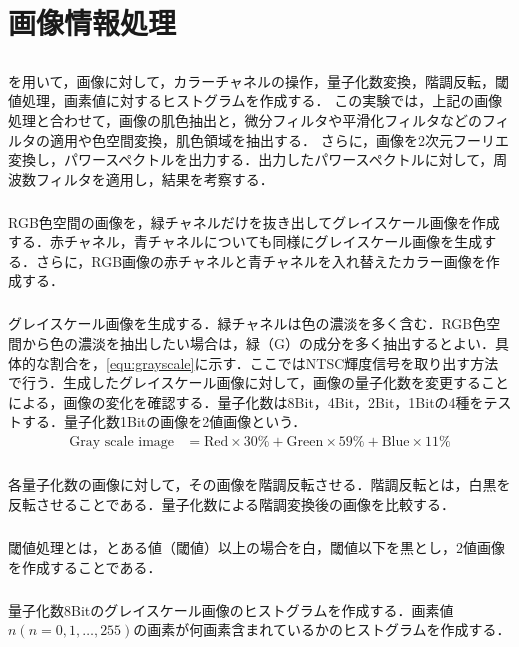 \chapter{画像情報処理}
\section{\purpose}
\matlab を用いて，画像に対して，カラーチャネルの操作，量子化数変換，階調反転，閾値処理，画素値に対するヒストグラムを作成する．
この実験では，上記の画像処理と合わせて，画像の肌色抽出と，微分フィルタや平滑化フィルタなどのフィルタの適用や色空間変換，肌色領域を抽出する．
さらに，画像を2次元フーリエ変換し，パワースペクトルを出力する．出力したパワースペクトルに対して，周波数フィルタを適用し，結果を考察する．
\paragraph{\kadaiaa}RGB色空間の画像を，緑チャネルだけを抜き出してグレイスケール画像を作成する．赤チャネル，青チャネルについても同様にグレイスケール画像を生成する．さらに，RGB画像の赤チャネルと青チャネルを入れ替えたカラー画像を作成する．
\paragraph{\kadaiab}グレイスケール画像を生成する．緑チャネルは色の濃淡を多く含む．RGB色空間から色の濃淡を抽出したい場合は，緑（G）の成分を多く抽出するとよい．具体的な割合を，\eqref{equ:grayscale}に示す．ここではNTSC輝度信号を取り出す方法で行う．生成したグレイスケール画像に対して，画像の量子化数を変更することによる，画像の変化を確認する．量子化数は8Bit，4Bit，2Bit，1Bitの4種をテストする．量子化数1Bitの画像を2値画像という．
\begin{align}
    \textrm{Gray scale image} & = \textrm{Red}\times 30\% +\textrm{Green}\times 59\% +\textrm{Blue}\times 11\%\label{equ:grayscale}
\end{align}
\paragraph{\kadaiac}各量子化数の画像に対して，その画像を階調反転させる．階調反転とは，白黒を反転させることである．量子化数による階調変換後の画像を比較する．
\paragraph{\kadaiad}閾値処理とは，とある値（閾値）以上の場合を白，閾値以下を黒とし，2値画像を作成することである．
\paragraph{\kadaiae}量子化数8Bitのグレイスケール画像のヒストグラムを作成する．画素値\(n(n=0,1,\dots ,255)\)の画素が何画素含まれているかのヒストグラムを作成する．
